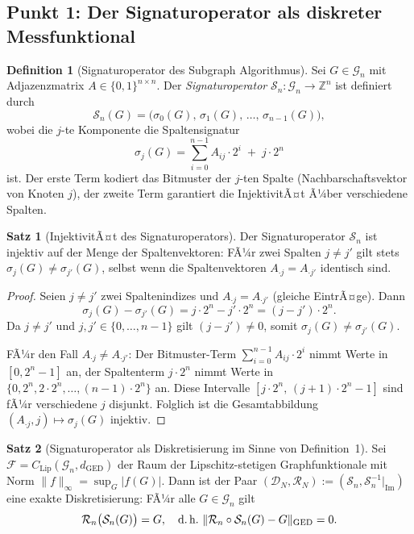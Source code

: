 ﻿\documentclass[a4paper,12pt]{article}
\theoremstyle{definition}
\newtheorem{definition}{Definition}
\newtheorem{satz}{Satz}
\begin{document}
\subsection{Punkt 1: Der Signaturoperator als diskreter Messfunktional}

\begin{definition}[Signaturoperator des Subgraph Algorithmus]
\label{def:sigop}
    Sei $G \in \mathcal{G}_n$ mit Adjazenzmatrix $A \in \{0,1\}^{n \times n}$.
    Der \emph{Signaturoperator} $\mathcal{S}_n : \mathcal{G}_n \to \mathbb{Z}^n$ ist definiert durch
    \[
    \mathcal{S}_n(G) = \bigl(\sigma_0(G),\, \sigma_1(G),\, \ldots,\, \sigma_{n-1}(G)\bigr),
    \]
    wobei die $j$-te Komponente die Spaltensignatur
    \[
    \sigma_j(G) = \sum_{i=0}^{n-1} A_{ij} \cdot 2^i \;+\; j \cdot 2^n
    \]
    ist. Der erste Term kodiert das Bitmuster der $j$-ten Spalte (Nachbarschaftsvektor von
    Knoten $j$), der zweite Term garantiert die InjektivitÃ¤t Ã¼ber verschiedene Spalten.
\end{definition}

\begin{satz}[InjektivitÃ¤t des Signaturoperators]
\label{satz:inj}
    Der Signaturoperator $\mathcal{S}_n$ ist injektiv auf der Menge der Spaltenvektoren:
    FÃ¼r zwei Spalten $j \neq j'$ gilt stets $\sigma_j(G) \neq \sigma_{j'}(G)$, selbst wenn die
    Spaltenvektoren $A_{\cdot j} = A_{\cdot j'}$ identisch sind.
\end{satz}

\begin{proof}
    Seien $j \neq j'$ zwei Spaltenindizes und $A_{\cdot j} = A_{\cdot j'}$ (gleiche EintrÃ¤ge).
    Dann
    \[
    \sigma_j(G) - \sigma_{j'}(G) = j \cdot 2^n - j' \cdot 2^n = (j - j') \cdot 2^n.
    \]
    Da $j \neq j'$ und $j, j' \in \{0, \ldots, n-1\}$ gilt $(j - j') \neq 0$, somit
    $\sigma_j(G) \neq \sigma_{j'}(G)$.

    FÃ¼r den Fall $A_{\cdot j} \neq A_{\cdot j'}$: Der Bitmuster-Term
    $\sum_{i=0}^{n-1} A_{ij} \cdot 2^i$ nimmt Werte in $[0, 2^n - 1]$ an, der Spaltenterm
    $j \cdot 2^n$ nimmt Werte in $\{0, 2^n, 2 \cdot 2^n, \ldots, (n-1) \cdot 2^n\}$ an.
    Diese Intervalle $[j \cdot 2^n,\, (j+1) \cdot 2^n - 1]$ sind fÃ¼r verschiedene $j$ disjunkt.
    Folglich ist die Gesamtabbildung $(A_{\cdot j}, j) \mapsto \sigma_j(G)$ injektiv. \qedhere
\end{proof}

\begin{satz}[Signaturoperator als Diskretisierung im Sinne von Definition~1]
\label{satz:sigdisk}
    Sei $\mathcal{F} = C_{\mathrm{Lip}}(\mathcal{G}_n, d_{\mathrm{GED}})$ der Raum der
    Lipschitz-stetigen Graphfunktionale mit Norm $\|f\|_\infty = \sup_G |f(G)|$.
    Dann ist der Paar $(\mathcal{D}_N, \mathcal{R}_N) := (\mathcal{S}_n, \mathcal{S}_n^{-1}|_{\mathrm{Im}})$
    eine exakte Diskretisierung: FÃ¼r alle $G \in \mathcal{G}_n$ gilt
    \[
    \mathcal{R}_n\bigl(\mathcal{S}_n(G)\bigr) = G,\quad
    \text{d.\,h.\ }\|\mathcal{R}_n \circ \mathcal{S}_n(G) - G\|_{\mathrm{GED}} = 0.
    \]
\end{satz}
\end{document}
